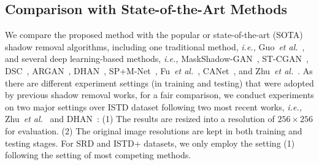 \documentclass[letterpaper]{article} \usepackage{aaai23}  \usepackage{times}  \usepackage{helvet}  \usepackage{courier}  \usepackage[hyphens]{url}  \usepackage{graphicx} \urlstyle{rm} \def\UrlFont{\rm}  \usepackage{natbib}  \usepackage{caption} \frenchspacing  \setlength{\pdfpagewidth}{8.5in} \setlength{\pdfpageheight}{11in} \usepackage{algorithm}
\def\etal{\emph{et al.}}
\newcommand{\ie}{\textit{i.e., }}
\begin{document}
\subsection{Comparison with State-of-the-Art Methods}
We compare the proposed method with the popular or state-of-the-art (SOTA) shadow removal algorithms, including one traditional method, \ie Guo~\etal~\cite{guo2012paired}, and several deep learning-based methods, \ie MaskShadow-GAN~\cite{hu2019mask}, ST-CGAN~\cite{wang2018stacked}, DSC~\cite{hu2019direction},  ARGAN~\cite{ding2019argan}, DHAN~\cite{cun2020towards}, SP+M-Net~\cite{le2019shadow}, Fu~\etal~\cite{fu2021auto}, CANet~\cite{chen2021canet}, and Zhu~\etal~\cite{zhu2022efficient}.
As there are different experiment settings (in training and testing) that were adopted by previous shadow removal works, for a fair comparison, we conduct experiments on two major settings over ISTD dataset following two most recent works, \ie Zhu~\etal~\cite{zhu2022efficient} and DHAN~\cite{cun2020towards}: (1) 
The results are resized into a resolution of $256\times 256$ for evaluation. (2) The original image resolutions are kept in both training and testing stages. For SRD and ISTD+ datasets, we only employ the setting (1) following the setting of most competing methods.
\end{document}
